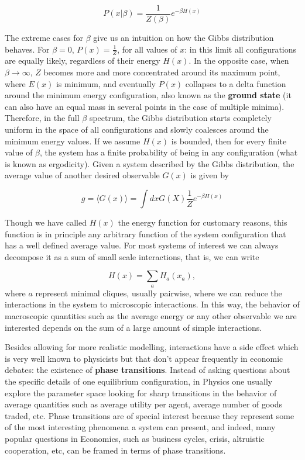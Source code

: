 \begin{equation}
\label{eq:sm_gibbs}
    P (x | \beta) = \frac{1}{Z(\beta)} e^{-\beta H(x)}
\end{equation}

The extreme cases for $\beta$ give us an intuition on how the Gibbs distribution behaves. For $\beta = 0$, $P(x) = \frac{1}{Z}$, for all values of $x$: in this limit all configurations are equally likely, regardless of their energy $H(x)$. In the opposite case, when $\beta \to \infty$, $Z$ becomes more and more concentrated around its maximum point, where $E(x)$ is minimum, and eventually $P(x)$ collapses to a delta function around the minimum energy configuration, also known as the \textbf{ground state} (it can also have an equal mass in several points in the case of multiple minima). Therefore, in the full $\beta$ spectrum, the Gibbs distribution starts completely uniform in the space of all configurations and slowly coalesces around the minimum energy values. If we assume $H(x)$ is bounded, then for every finite value of $\beta$, the system has a finite probability of being in any configuration (what is known as ergodicity). Given a system described by the Gibbs distribution, the average value of another desired observable $G(x)$ is given by

\begin{equation}
g = \langle G(x) \rangle = \int dx G(X) \frac{1}{Z} e^{-\beta H(x)}
\end{equation}

Though we have called $H(x)$ the energy function for customary reasons, this function is in principle any arbitrary function of the system configuration that has a well defined average value. For most systems of interest we can always decompose it as a sum of small scale interactions, that is, we can write

\begin{equation}
    H(x) = \sum_{a} H_a (x_a),
\end{equation}
where $a$ represent minimal cliques, usually pairwise, where we can reduce the interactions in the system to microscopic interactions. In this way, the behavior of macroscopic quantities such as the average energy or any other observable we are interested depends on the sum of a large amount of simple interactions. 

Besides allowing for more realistic modelling, interactions have a side effect which is very well known to physicists but that don't appear frequently in economic debates: the existence of \textbf{phase transitions}. Instead of asking questions about the specific details of one equilibrium configuration, in Physics one usually explore the parameter space looking for sharp transitions in the behavior of average quantities such as average utility per agent, average number of goods traded, etc. Phase transitions are of special interest because they represent some of the most interesting phenomena a system can present, and indeed, many popular questions in Economics, such as business cycles, crisis, altruistic cooperation, etc, can be framed in terms of phase transitions.

